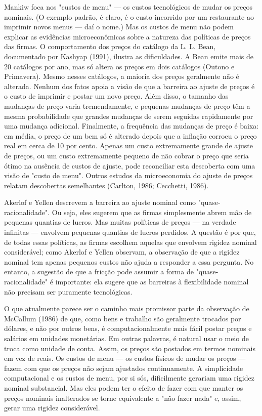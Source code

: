 \documentclass[12pt]{article}
\begin{document}
{Mankiw foca nos "custos de menu" — os custos tecnológicos de mudar os preços nominais. (O exemplo padrão, é claro, é o custo incorrido por um restaurante ao imprimir novos menus — daí o nome.) Mas os custos de menu não podem explicar as evidências microeconômicas sobre a natureza das políticas de preços das firmas. O comportamento dos preços do catálogo da L. L. Bean, documentado por Kashyap (1991), ilustra as dificuldades. A Bean emite mais de 20 catálogos por ano, mas só altera os preços em dois catálogos (Outono e Primavera). Mesmo nesses catálogos, a maioria dos preços geralmente não é alterada. Nenhum dos fatos apoia a visão de que a barreira ao ajuste de preços é o custo de imprimir e postar um novo preço. Além disso, o tamanho das mudanças de preço varia tremendamente, e pequenas mudanças de preço têm a mesma probabilidade que grandes mudanças de serem seguidas rapidamente por uma mudança adicional. Finalmente, a frequência das mudanças de preço é baixa: em média, o preço de um bem só é alterado depois que a inflação corroeu o preço real em cerca de 10 por cento. Apenas um custo extremamente grande de ajuste de preços, ou um custo extremamente pequeno de não cobrar o preço que seria ótimo na ausência de custos de ajuste, pode reconciliar esta descoberta com uma visão de "custo de menu". Outros estudos da microeconomia do ajuste de preços relatam descobertas semelhantes (Carlton, 1986; Cecchetti, 1986).

Akerlof e Yellen descrevem a barreira ao ajuste nominal como "quase-racionalidade". Ou seja, eles sugerem que as firmas simplesmente abrem mão de pequenas quantias de lucros. Mas muitas políticas de preços — na verdade infinitas — envolvem pequenas quantias de lucros perdidos. A questão é por que, de todas essas políticas, as firmas escolhem aquelas que envolvem rigidez nominal considerável; como Akerlof e Yellen observam, a observação de que a rigidez nominal tem apenas pequenos custos não ajuda a responder a essa pergunta. No entanto, a sugestão de que a fricção pode assumir a forma de "quase-racionalidade" é importante: ela sugere que as barreiras à flexibilidade nominal não precisam ser puramente tecnológicas.

O que atualmente parece ser o caminho mais promissor parte da observação de McCallum (1986) de que, como bens e trabalho são geralmente trocados por dólares, e não por outros bens, é computacionalmente mais fácil postar preços e salários em unidades monetárias. Em outras palavras, é natural usar o meio de troca como unidade de conta. Assim, os preços são postados em termos nominais em vez de reais. Os custos de menu — os custos físicos de mudar os preços — fazem com que os preços não sejam ajustados continuamente. A simplicidade computacional e os custos de menu, por si sós, dificilmente gerariam uma rigidez nominal substancial. Mas eles podem ter o efeito de fazer com que manter os preços nominais inalterados se torne equivalente a "não fazer nada" e, assim, gerar uma rigidez considerável.

}
\end{document}
